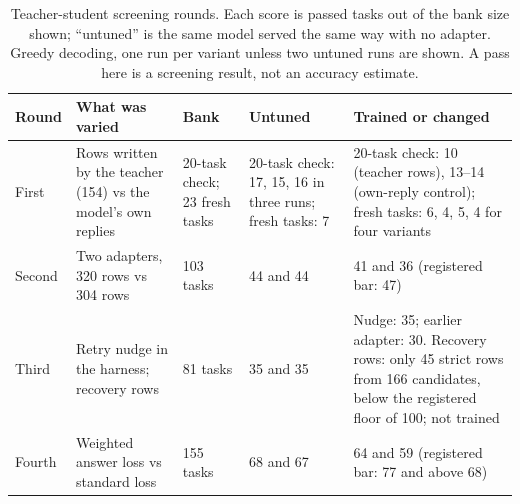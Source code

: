 \begin{table}[!htbp]
\centering
\caption{Teacher-student screening rounds. Each score is passed tasks out of the bank size shown; ``untuned'' is the same model served the same way with no adapter. Greedy decoding, one run per variant unless two untuned runs are shown. A pass here is a screening result, not an accuracy estimate.}
\label{tab:distill-rounds}
\begin{tabular}{@{}p{2.6cm}p{3.0cm}p{2.1cm}p{3.2cm}p{3.3cm}@{}}
\toprule
Round & What was varied & Bank & Untuned & Trained or changed \\
\midrule
First & Rows written by the teacher (154) vs the model's own replies & 20-task check; 23 fresh tasks & 20-task check: 17, 15, 16 in three runs; fresh tasks: 7 & 20-task check: 10 (teacher rows), 13--14 (own-reply control); fresh tasks: 6, 4, 5, 4 for four variants \\
Second & Two adapters, 320 rows vs 304 rows & 103 tasks & 44 and 44 & 41 and 36 (registered bar: 47) \\
Third & Retry nudge in the harness; recovery rows & 81 tasks & 35 and 35 & Nudge: 35; earlier adapter: 30. Recovery rows: only 45 strict rows from 166 candidates, below the registered floor of 100; not trained \\
Fourth & Weighted answer loss vs standard loss & 155 tasks & 68 and 67 & 64 and 59 (registered bar: 77 and above 68) \\
\bottomrule
\end{tabular}
\end{table}
